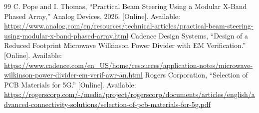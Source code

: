 \documentclass[11pt]{IEEEtran}
\begin{document}
\begin{thebibliography}{99}
 C. Pope and I. Thomas, ``Practical Beam Steering Using a Modular X-Band Phased Array,'' Analog Devices, 2026. [Online]. Available: \url{https://www.analog.com/en/resources/technical-articles/practical-beam-steering-using-modular-x-band-phased-array.html}
 Cadence Design Systems, ``Design of a Reduced Footprint Microwave Wilkinson Power Divider with EM Verification.'' [Online]. Available: \url{https://www.cadence.com/en_US/home/resources/application-notes/microwave-wilkinson-power-divider-em-verif-awr-an.html}
 Rogers Corporation, ``Selection of PCB Materials for 5G.'' [Online]. Available: \url{https://rogerscorp.com/-/media/project/rogerscorp/documents/articles/english/advanced-connectivity-solutions/selection-of-pcb-materials-for-5g.pdf}
\end{thebibliography}
\end{document}

